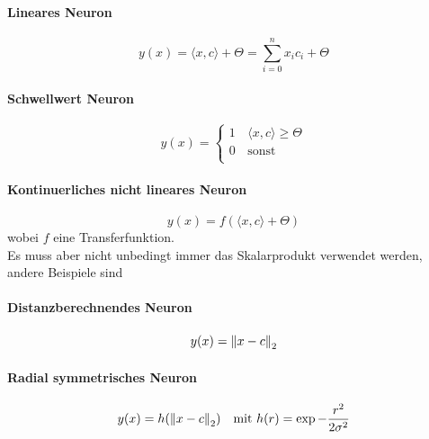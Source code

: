 \paragraph{Lineares Neuron}
\begin{equation*}
    y(x) = \langle x,c \rangle + \Theta = \sum_{i=0}^n x_ic_i + \Theta
\end{equation*}

\paragraph{Schwellwert Neuron}
\begin{equation*}
    y (x) = \left\{
                                        \begin{array}{ll}
                                        1 & \,\langle x,c \rangle \geq \Theta \\
                                        0 & \, \text{sonst} \\
                                        \end{array}
                                        \right. 
\end{equation*}

\paragraph{Kontinuerliches nicht lineares Neuron}
\begin{equation*}
    y(x) = f(\langle x,c \rangle + \Theta)
\end{equation*}
wobei $f$ eine Transferfunktion.\\

Es muss aber nicht unbedingt immer das Skalarprodukt verwendet werden, andere Beispiele sind

\paragraph{Distanzberechnendes Neuron}
\begin{equation*}
    y(x) = \left\lVert x-c\right\rVert_2
\end{equation*}

\paragraph{Radial symmetrisches Neuron}
\begin{equation*}
    y(x) = h(\left\lVert x-c\right\rVert_2) \quad \text{mit } h(r) = \exp{-\frac{r^2}{2\sigma^2}}
\end{equation*}